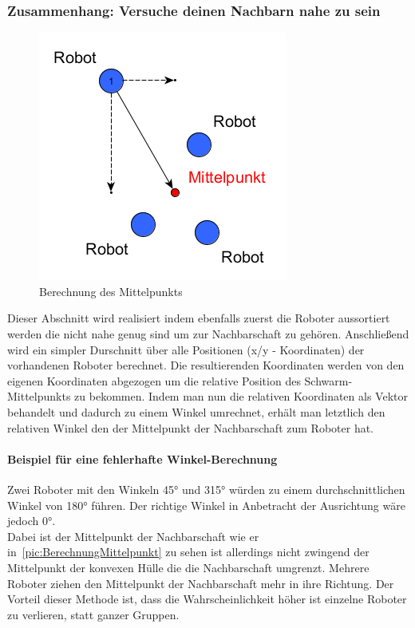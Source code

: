 \subsubsection*{Zusammenhang: Versuche deinen Nachbarn nahe zu sein}

\begin{figure}
	\includegraphics[width=\pictureWidth,keepaspectratio]{graphics/SchwarmMittelpunktBerechnung.png}
	\caption{Berechnung des Mittelpunkts}
	\label{pic:BerechnungMittelpunkt}
\end{figure}

Dieser Abschnitt wird realisiert indem ebenfalls zuerst die Roboter aussortiert werden die nicht nahe genug sind um zur Nachbarschaft zu gehören. Anschließend wird ein simpler Durschnitt über alle Positionen (x/y - Koordinaten) der vorhandenen Roboter berechnet. Die resultierenden Koordinaten werden von den eigenen Koordinaten abgezogen um die relative Position des Schwarm-Mittelpunkts zu bekommen. Indem man nun die relativen Koordinaten als Vektor behandelt und dadurch zu einem Winkel umrechnet, erhält man letztlich den relativen Winkel den der Mittelpunkt der Nachbarschaft zum Roboter hat.

\paragraph*{Beispiel für eine fehlerhafte Winkel-Berechnung}
Zwei Roboter mit den Winkeln 45° und 315° würden zu einem durchschnittlichen Winkel von 180° führen. Der richtige Winkel in Anbetracht der Ausrichtung wäre jedoch 0°.\\

Dabei ist der Mittelpunkt der Nachbarschaft wie er in~\autoref{pic:BerechnungMittelpunkt} zu sehen ist allerdings nicht zwingend der Mittelpunkt der konvexen Hülle die die Nachbarschaft umgrenzt. Mehrere Roboter ziehen den Mittelpunkt der Nachbarschaft mehr in ihre Richtung. Der Vorteil dieser Methode ist, dass die Wahrscheinlichkeit höher ist einzelne Roboter zu verlieren, statt ganzer Gruppen.


